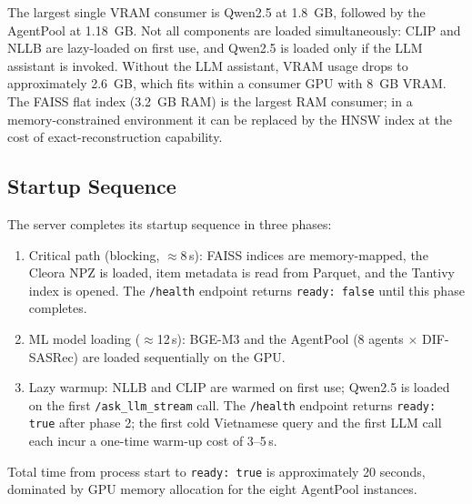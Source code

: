 The largest single VRAM consumer is Qwen2.5 at 1.8~GB, followed by the AgentPool at 1.18~GB.
Not all components are loaded simultaneously: CLIP and NLLB are lazy-loaded on first use, and Qwen2.5 is loaded only if the LLM assistant is invoked.
Without the LLM assistant, VRAM usage drops to approximately 2.6~GB, which fits within a consumer GPU with 8~GB VRAM.
The FAISS flat index (3.2~GB RAM) is the largest RAM consumer; in a memory-constrained environment it can be replaced by the HNSW index at the cost of exact-reconstruction capability.

\subsection{Startup Sequence}

The server completes its startup sequence in three phases:
\begin{enumerate}
    \item Critical path (blocking, $\approx$8\,s): FAISS indices are memory-mapped, the Cleora NPZ is loaded, item metadata is read from Parquet, and the Tantivy index is opened. The \texttt{/health} endpoint returns \texttt{ready: false} until this phase completes.
    \item ML model loading ($\approx$12\,s): BGE-M3 and the AgentPool (8 agents $\times$ DIF-SASRec) are loaded sequentially on the GPU.
    \item Lazy warmup: NLLB and CLIP are warmed on first use; Qwen2.5 is loaded on the first \texttt{/ask\_llm\_stream} call. The \texttt{/health} endpoint returns \texttt{ready: true} after phase 2; the first cold Vietnamese query and the first LLM call each incur a one-time warm-up cost of 3--5\,s.
\end{enumerate}
Total time from process start to \texttt{ready: true} is approximately 20 seconds, dominated by GPU memory allocation for the eight AgentPool instances.

